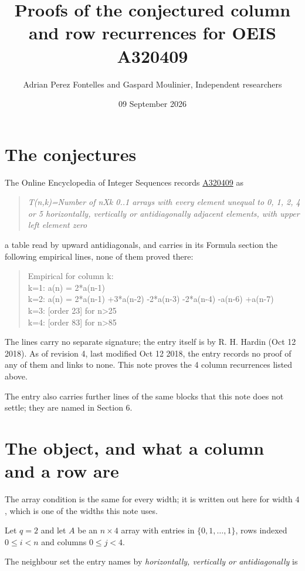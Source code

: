 \documentclass[11pt]{article}
\title{Proofs of the conjectured column and row recurrences for OEIS A320409}
\author{Adrian Perez Fontelles and Gaspard Moulinier, Independent researchers}
\date{09 September 2026}
\theoremstyle{definition}
\begin{document}
\maketitle
\section{The conjectures}

The Online Encyclopedia of Integer Sequences records \href{https://oeis.org/A320409}{A320409} as

\begin{quote}\itshape T(n,k)=Number of nXk 0..1 arrays with every element unequal to 0, 1, 2, 4 or 5 horizontally, vertically or antidiagonally adjacent elements, with upper left element zero\end{quote}

a table read by upward antidiagonals, and carries in its Formula section the following empirical lines, none of them proved there:

\begin{quote}\ttfamily Empirical for column k:\\
k=1: a(n) = 2*a(n-1)\\k=2: a(n) = 2*a(n-1) +3*a(n-2) -2*a(n-3) -2*a(n-4) -a(n-6) +a(n-7)\\k=3: [order 23] for n>25\\k=4: [order 83] for n>85\end{quote}

The lines carry no separate signature; the entry itself is by R. H. Hardin (Oct 12 2018). As of revision 4, last modified Oct 12 2018, the entry records no proof of any of them and links to none. This note proves the 4 column recurrences listed above.

The entry also carries further lines of the same blocks that this note does not settle; they are named in Section 6.

\section{The object, and what a column and a row are}

The array condition is the same for every width; it is written out here for width $4$, which is one of the widths this note uses.

Let $q = 2$ and let $A$ be an $n \times 4$ array with entries in $\{0,1,\dots,1\}$, rows indexed $0 \le i < n$ and columns $0 \le j < 4$.

The neighbour set the entry names by {\itshape horizontally, vertically or antidiagonally} is
\end{document}
